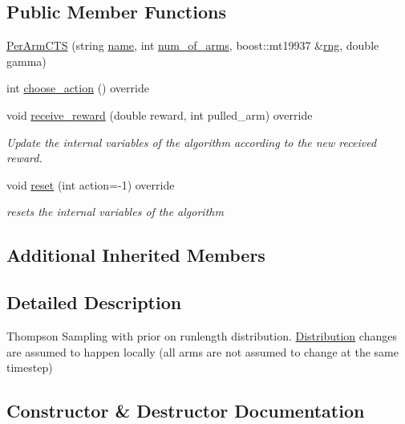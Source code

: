 \subsection*{Public Member Functions}
\begin{DoxyCompactItemize}
\item 
\mbox{\hyperlink{class_per_arm_c_t_s_a87170c6aefd052d6ea8bb20866f6f32e}{Per\+Arm\+C\+TS}} (string \mbox{\hyperlink{class_m_a_b_algorithm_a77b10ecc4b49d519c557f65358167b82}{name}}, int \mbox{\hyperlink{class_m_a_b_algorithm_a340fa9e83e85b092f2c6125fc4e8549b}{num\+\_\+of\+\_\+arms}}, boost\+::mt19937 \&\mbox{\hyperlink{class_thompson_sampling_a1b66efa9bb0912df92975147f8923216}{rng}}, double gamma)
\item 
int \mbox{\hyperlink{class_per_arm_c_t_s_ab8904bef227b13aed75aade589421c5a}{choose\+\_\+action}} () override
\item 
void \mbox{\hyperlink{class_per_arm_c_t_s_af9ac7b45d329223ce506e977b96a32ee}{receive\+\_\+reward}} (double reward, int pulled\+\_\+arm) override
\begin{DoxyCompactList}\small\item\em Update the internal variables of the algorithm according to the new received reward. \end{DoxyCompactList}\item 
void \mbox{\hyperlink{class_per_arm_c_t_s_ae5f8998bfb68b4a9cbdea7bca34f5cbe}{reset}} (int action=-\/1) override
\begin{DoxyCompactList}\small\item\em resets the internal variables of the algorithm \end{DoxyCompactList}\end{DoxyCompactItemize}
\subsection*{Additional Inherited Members}


\subsection{Detailed Description}
Thompson Sampling with prior on runlength distribution. \mbox{\hyperlink{class_distribution}{Distribution}} changes are assumed to happen locally (all arms are not assumed to change at the same timestep) 

\subsection{Constructor \& Destructor Documentation}
\mbox{\label{class_per_arm_c_t_s_a87170c6aefd052d6ea8bb20866f6f32e}} 
